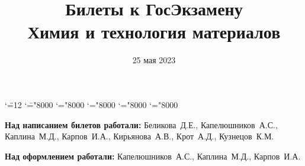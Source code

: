 \documentclass[a4paper, 12pt]{article} %
\begin{document}

\begingroup \catcode`\"=12
\gdef\newmcodes@{\mathcode`\'39\mathcode`\*42\mathcode`\."613A%
\mathcode`\-"8000\mathcode`\/47\mathcode`\:"603A\relax}%
\endgroup
\mathcode`\=="8000 \mathcode`\+="8000 \mathcode`\-="8000
\mathcode`\<="8000 \mathcode`\>="8000

\graphicspath{{images/}}

\title{Билеты к ГосЭкзамену \\ Химия и технология материалов}
\date{25 мая 2023}

\maketitle

\pagebreak
\hspace{0pt}
\vfill
\begin{center}
    \textbf{Над написанием билетов работали:} \mbox{Беликова Д.Е.}, \mbox{Капелюшников А.С.}, \mbox{Каплина М.Д.}, \mbox{Карпов И.А.}, \mbox{Кирьянова А.В.}, \mbox{Крот А.Д.}, \mbox{Кузнецов К.М.}

    \textbf{Над оформлением работали:} \mbox{Капелюшников А.С.}, \mbox{Каплина М.Д.}, \mbox{Карпов И.А.}
\end{center}

\vfill
\hspace{0pt}
\pagebreak

\tableofcontents





\end{document}
